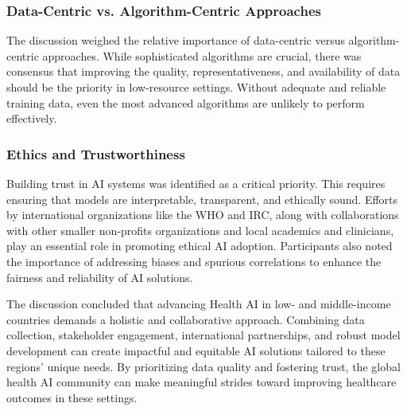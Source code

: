 \subsubsection{Data-Centric vs. Algorithm-Centric Approaches}
The discussion weighed the relative importance of data-centric versus algorithm-centric approaches. While sophisticated algorithms are crucial, there was consensus that improving the quality, representativeness, and availability of data should be the priority in low-resource settings. Without adequate and reliable training data, even the most advanced algorithms are unlikely to perform effectively.

\subsubsection{Ethics and Trustworthiness}
Building trust in AI systems was identified as a critical priority. This requires ensuring that models are interpretable, transparent, and ethically sound. Efforts by international organizations like the WHO and IRC, along with collaborations with other smaller non-profits organizations and local academics and clinicians, play an essential role in promoting ethical AI adoption. Participants also noted the importance of addressing biases and spurious correlations to enhance the fairness and reliability of AI solutions.


The discussion concluded that advancing Health AI in low- and middle-income countries demands a holistic and collaborative approach. Combining data collection, stakeholder engagement, international partnerships, and robust model development can create impactful and equitable AI solutions tailored to these regions' unique needs. By prioritizing data quality and fostering trust, the global health AI community can make meaningful strides toward improving healthcare outcomes in these settings.




